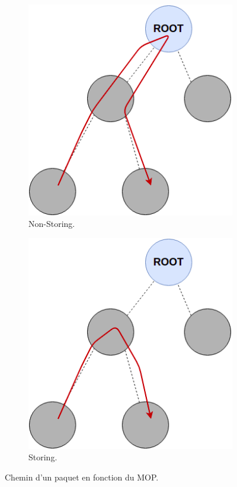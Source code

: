     \begin{figure}[H]
        \centering
        \begin{subfigure}[b]{0.45\textwidth}
            \includegraphics[scale=0.4]{res/rpl-nonstoring.drawio.png}
            \caption{Non-Storing.}
            \label{fig:state-path-nonstoring}
        \end{subfigure}
        \hfill
        \begin{subfigure}[b]{0.45\textwidth}
            \includegraphics[scale=0.4]{res/rpl-storing.drawio.png}
            \caption{Storing.}
            \label{fig:state-path-storing}
        \end{subfigure}
        \caption{Chemin d'un paquet en fonction du MOP.}
        \label{fig:state-path-mop}
    \end{figure}

